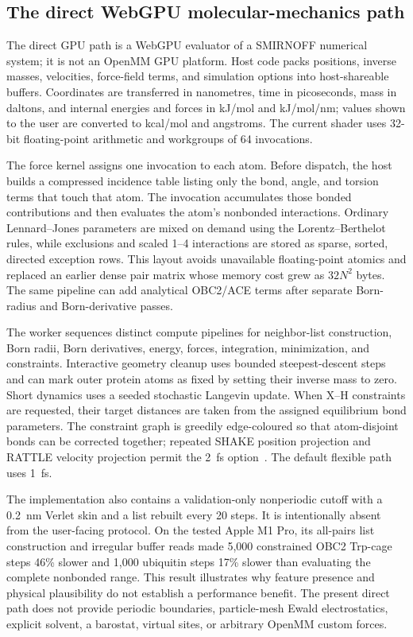 \subsection{The direct WebGPU molecular-mechanics path}
\label{app:direct-webgpu}

The direct GPU path is a WebGPU evaluator of a SMIRNOFF numerical system; it is
not an OpenMM GPU platform.
Host code packs positions, inverse masses, velocities, force-field terms, and
simulation options into host-shareable buffers.
Coordinates are transferred in nanometres, time in picoseconds, mass in
daltons, and internal energies and forces in kJ/mol and kJ/mol/nm; values shown
to the user are converted to kcal/mol and angstroms.
The current shader uses 32-bit floating-point arithmetic and workgroups of 64
invocations.

The force kernel assigns one invocation to each atom.
Before dispatch, the host builds a compressed incidence table listing only the
bond, angle, and torsion terms that touch that atom.
The invocation accumulates those bonded contributions and then evaluates the
atom's nonbonded interactions.
Ordinary Lennard--Jones parameters are mixed on demand using the
Lorentz--Berthelot rules, while exclusions and scaled 1--4 interactions are
stored as sparse, sorted, directed exception rows.
This layout avoids unavailable floating-point atomics and replaced an earlier
dense pair matrix whose memory cost grew as $32N^2$ bytes.
The same pipeline can add analytical OBC2/ACE terms after separate Born-radius
and Born-derivative passes.

The worker sequences distinct compute pipelines for neighbor-list construction,
Born radii, Born derivatives, energy, forces, integration, minimization, and
constraints.
Interactive geometry cleanup uses bounded steepest-descent steps and can mark
outer protein atoms as fixed by setting their inverse mass to zero.
Short dynamics uses a seeded stochastic Langevin update.
When X--H constraints are requested, their target distances are taken from the
assigned equilibrium bond parameters.
The constraint graph is greedily edge-coloured so that atom-disjoint bonds can
be corrected together; repeated SHAKE position projection and RATTLE velocity
projection permit the 2~fs option~\cite{ryckaert1977shake,andersen1983rattle}.
The default flexible path uses 1~fs.

The implementation also contains a validation-only nonperiodic cutoff with a
0.2~nm Verlet skin and a list rebuilt every 20 steps.
It is intentionally absent from the user-facing protocol.
On the tested Apple M1 Pro, its all-pairs list construction and irregular buffer
reads made 5,000 constrained OBC2 Trp-cage steps 46\% slower and 1,000 ubiquitin
steps 17\% slower than evaluating the complete nonbonded range.
This result illustrates why feature presence and physical plausibility do not
establish a performance benefit.
The present direct path does not provide periodic boundaries, particle-mesh
Ewald electrostatics, explicit solvent, a barostat, virtual sites, or arbitrary
OpenMM custom forces.

